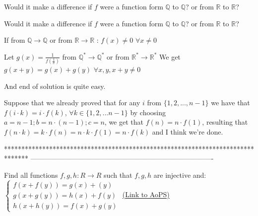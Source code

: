 \begin{solution}
	Would it make a difference if $f$ were a function form $\mathbb{Q}$ to $\mathbb{Q}$? or from $\mathbb{R}$ to $\mathbb{R}$?
\end{solution}



\begin{solution}
	\begin{tcolorbox}Would it make a difference if $f$ were a function form $\mathbb{Q}$ to $\mathbb{Q}$? or from $\mathbb{R}$ to $\mathbb{R}$?\end{tcolorbox}
If from $\mathbb Q\to\mathbb Q$ or from $\mathbb R\to\mathbb R$ :
$f(x)\ne 0$ $\forall x\ne 0$

Let $g(x)=\frac 1{f(\frac 1x)}$ from $\mathbb Q^*\to\mathbb Q^*$ or from $\mathbb R^*\to\mathbb R^*$
We get $g(x+y)=g(x)+g(y)$ $\forall x,y,x+y\ne 0$

And end of solution is quite easy.
\end{solution}



\begin{solution}
	Suppose that we already proved that for any $i$ from $\{1,2,...,n-1\}$ we have that $f(i\cdot k)=i \cdot f(k)$, $\forall k \in \{1,2,...n-1\}$
by choosing $a=n-1;b=n\cdot (n-1); c=n$, we get that $f(n)=n \cdot f(1)$, resulting that $f(n \cdot k)=k \cdot f(n)=n\cdot k\cdot f(1)=n \cdot f(k)$ and I think we're done.
\end{solution}
*******************************************************************************
-------------------------------------------------------------------------------

\begin{problem}
	Find all functions $f,g,h:R\to R$ such that $f,g,h$ are injective and:
$\begin{cases}f(x+f(y))=g(x)+(y)\\g(x+g(y))=h(x)+f(y)\\h(x+h(y))=f(x)+g(y)\end{cases}$
	\flushright \href{https://artofproblemsolving.com/community/c6h615778}{(Link to AoPS)}
\end{problem}



